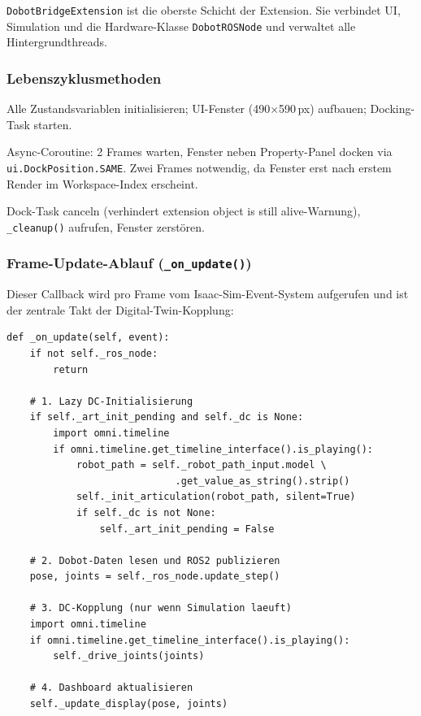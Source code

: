 \documentclass[11pt,a4paper]{article}
\begin{document}
\texttt{DobotBridgeExtension} ist die oberste Schicht der Extension.
Sie verbindet UI, Simulation und die Hardware-Klasse
\texttt{DobotROSNode} und verwaltet alle Hintergrundthreads.

\subsubsection{Lebenszyklusmethoden}

\begin{description}[leftmargin=4.5cm, style=nextline]
  \item[\texttt{on\_startup(ext\_id)}]
    Alle Zustandsvariablen initialisieren; UI-Fenster
    (490$\times$590\,px) aufbauen; Docking-Task starten.

  \item[\texttt{\_dock\_window\_deferred()}]
    Async-Coroutine: 2 Frames warten, Fenster neben
    Property-Panel docken via \texttt{ui.DockPosition.SAME}.
    Zwei Frames notwendig, da Fenster erst nach erstem
    Render im Workspace-Index erscheint.

  \item[\texttt{on\_shutdown()}]
    Dock-Task canceln (verhindert \glqq extension object is still
    alive\grqq-Warnung), \texttt{\_cleanup()} aufrufen,
    Fenster zerstören.
\end{description}

\subsubsection{Frame-Update-Ablauf (\texttt{\_on\_update()})}

Dieser Callback wird pro Frame vom Isaac-Sim-Event-System aufgerufen
und ist der zentrale Takt der Digital-Twin-Kopplung:

\begin{lstlisting}[caption={\_on\_update() -- vollständiger Ablauf}]
def _on_update(self, event):
    if not self._ros_node:
        return

    # 1. Lazy DC-Initialisierung
    if self._art_init_pending and self._dc is None:
        import omni.timeline
        if omni.timeline.get_timeline_interface().is_playing():
            robot_path = self._robot_path_input.model \
                             .get_value_as_string().strip()
            self._init_articulation(robot_path, silent=True)
            if self._dc is not None:
                self._art_init_pending = False

    # 2. Dobot-Daten lesen und ROS2 publizieren
    pose, joints = self._ros_node.update_step()

    # 3. DC-Kopplung (nur wenn Simulation laeuft)
    import omni.timeline
    if omni.timeline.get_timeline_interface().is_playing():
        self._drive_joints(joints)

    # 4. Dashboard aktualisieren
    self._update_display(pose, joints)
\end{lstlisting}
\end{document}
